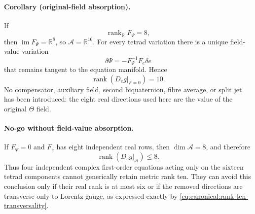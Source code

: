 \paragraph{Corollary (original-field absorption).}
If
\begin{equation}
 \operatorname{rank}_{\mathbb R}F_\Psi=8,
 \label{eq:canonical:field-jacobian-invertible}
\end{equation}
then $\operatorname{im}F_\Psi=\mathbb R^8$, so
$\mathcal A=\mathbb R^{16}$.  For every tetrad variation there is a unique
field-value variation
\begin{equation}
 \delta\Psi=-F_\Psi^{-1}F_e\delta e
\end{equation}
that remains tangent to the equation manifold.  Hence
\begin{equation}
 \boxed{
 \operatorname{rank}\left(D_e g\big|_{F=0}\right)=10.}
 \label{eq:canonical:no-extra-rank-ten}
\end{equation}
No compensator, auxiliary field, second biquaternion, fibre average, or split
jet has been introduced: the eight real directions used here are the value of
the original $\Theta$ field.

\paragraph{No-go without field-value absorption.}
If $F_\Psi=0$ and $F_e$ has eight independent real rows, then
$\dim\mathcal A=8$, and therefore
\begin{equation}
 \operatorname{rank}\left(D_e g\big|_{\mathcal A}\right)\leq8.
 \label{eq:canonical:eight-constraint-no-go}
\end{equation}
Thus four independent complex first-order equations acting only on the sixteen
tetrad components cannot generically retain metric rank ten.  They can avoid
this conclusion only if their real rank is at most six or if the removed
directions are transverse only to Lorentz gauge, as expressed exactly by
\eqref{eq:canonical:rank-ten-transversality}.

